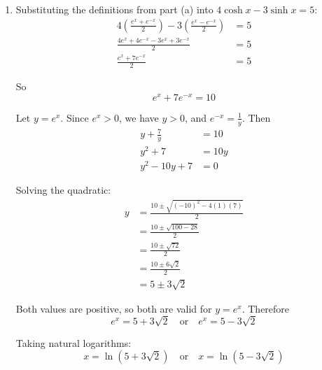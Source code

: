 \documentclass[leqno]{article}
\begin{document}
\begin{enumerate}[
  label=\textbf{\arabic*.},
  leftmargin=*,
  topsep=0pt,
  partopsep=0pt,
  parsep=0pt
]
\begin{djsSolution}
\begin{enumerate}[label=\textbf{(\alph*)}]
  Also
  \begin{align*}
  \cosh x-\sinh x
  &= \frac{e^x+e^{-x}}{2}-\frac{e^x-e^{-x}}{2}\\
  &= \frac{e^x+e^{-x}-e^x+e^{-x}}{2}\\
  &= \frac{2e^{-x}}{2}\\
  &= e^{-x}
  \end{align*}

  Hence
  \[
  \cosh x+\sinh x=e^x
  \qquad \text{and} \qquad
  \cosh x-\sinh x=e^{-x}
  \]

  \item Substituting the definitions from part (a) into \(4\cosh x-3\sinh x=5\):
  \begin{align*}
  4\left(\frac{e^x+e^{-x}}{2}\right)-3\left(\frac{e^x-e^{-x}}{2}\right)&=5\\
  \frac{4e^x+4e^{-x}-3e^x+3e^{-x}}{2}&=5\\
  \frac{e^x+7e^{-x}}{2}&=5
  \end{align*}

  So
  \[
  e^x+7e^{-x}=10
  \]

  Let \(y=e^x\). Since \(e^x>0\), we have \(y>0\), and \(e^{-x}=\frac{1}{y}\). Then
  \begin{align*}
  y+\frac{7}{y}&=10\\
  y^2+7&=10y\\
  y^2-10y+7&=0
  \end{align*}

  Solving the quadratic:
  \begin{align*}
  y&=\frac{10\pm\sqrt{(-10)^2-4(1)(7)}}{2}\\
  &=\frac{10\pm\sqrt{100-28}}{2}\\
  &=\frac{10\pm\sqrt{72}}{2}\\
  &=\frac{10\pm 6\sqrt2}{2}\\
  &=5\pm 3\sqrt2
  \end{align*}

  Both values are positive, so both are valid for \(y=e^x\). Therefore
  \[
  e^x=5+3\sqrt2 \quad \text{or} \quad e^x=5-3\sqrt2
  \]

  Taking natural logarithms:
  \[
  x=\ln(5+3\sqrt2)\quad \text{or}\quad x=\ln(5-3\sqrt2)
  \]

\end{enumerate}
\end{djsSolution}


\newpage

\questionitem


\end{enumerate}
\end{document}
